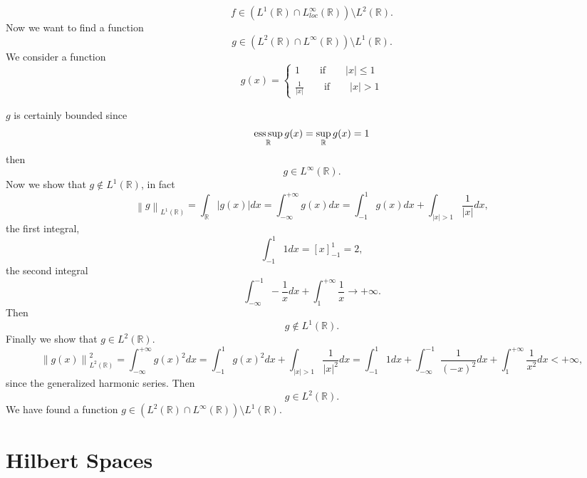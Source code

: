 \documentclass[a4paper, twoside, openany]{book}
\newcommand{\R}{\mathbb{R}}
\newcommand{\esssup}{\operatornamewithlimits{ess\,sup}}
\newcommand{\norm}[1]{\left\lVert#1\right\rVert}
\begin{document}
$$f \in (L^1(\mathbb{R}) \cap L_{loc}^{\infty}(\mathbb{R})) \setminus L^2(\mathbb{R}).$$ 
\clearpage
Now we want to find a function 
$$g \in (L^2(\mathbb{R}) \cap L^{\infty}(\mathbb{R})) \setminus L^1(\mathbb{R}).$$
We consider a function
$$g(x) = \begin{cases}
			1 \qquad \textrm{if} \qquad |x| \leq 1 \\
			\frac{1}{|x|} \qquad \textrm{if} \qquad |x| > 1
		 \end{cases}$$
\begin{figure}[!ht]
\begin{center}
\end{center}
\end{figure}
$g$ is certainly bounded since
$$\esssup_{\R} g(x) = \sup_{\R} g(x) = 1$$
then
$$g \in L^{\infty}(\R).$$
Now we show that $g \notin L^1(\R)$, in fact
$$\norm{g}_{L^1(\R)} = \int_{\R} |g(x)| dx = \int_{-\infty}^{+\infty} g(x) dx = \int_{-1}^1 g(x) dx  + \int_{|x| > 1} \frac{1}{|x|} dx,$$
the first integral,
$$\int_{-1}^1 1 dx = [x]_{-1}^1 = 2,$$
the second integral
$$\int_{-\infty}^{-1} -\frac{1}{x} dx + \int_1^{+\infty} \frac{1}{x} \rightarrow + \infty.$$
Then
$$g \notin L^1(\R).$$
Finally we show that $g \in L^2(\R)$.
$$\norm{g(x)}_{L^2(\R)}^2 = \int_{-\infty}^{+\infty} g(x)^2 dx = \int_{-1}^1 g(x)^2 dx + \int_{|x| > 1} \frac{1}{|x|^2} dx = \int_{-1}^1 1 dx + \int_{-\infty}^{-1} \frac{1}{(-x)^2} dx  + \int_1^{+\infty} \frac{1}{x^2} dx < +\infty,$$
since the generalized harmonic series. Then
$$g \in L^2(\R).$$
We have found a function $g \in (L^2(\R) \cap L^{\infty}(\R)) \setminus L^1(\R)$.
\chapter{Hilbert Spaces}
\end{document}

